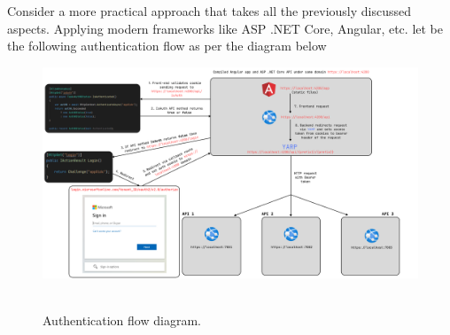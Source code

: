 Consider a more practical approach that takes all the previously discussed aspects.
Applying modern frameworks like ASP .NET Core, Angular, etc.
let be the following authentication flow as per the diagram below
\begin{figure}[H]
    \centering
    \includegraphics[width=1\textwidth]{img/Auth_flow_updated}
    ~\caption{Authentication flow diagram.}
\end{figure}

